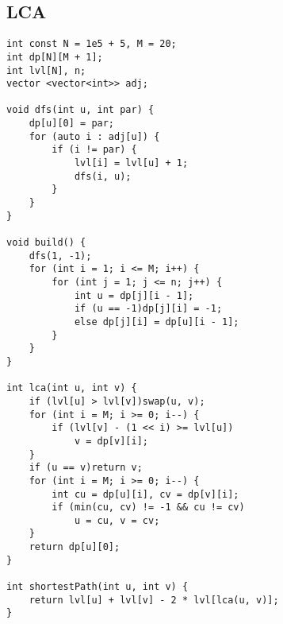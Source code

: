 \documentclass{article}
\begin{document}
\subsection{LCA}
\begin{verbatim}
int const N = 1e5 + 5, M = 20;
int dp[N][M + 1];
int lvl[N], n;
vector <vector<int>> adj;
 
void dfs(int u, int par) {
    dp[u][0] = par;
    for (auto i : adj[u]) {
        if (i != par) {
            lvl[i] = lvl[u] + 1;
            dfs(i, u);
        }
    }
}
 
void build() {
    dfs(1, -1);
    for (int i = 1; i <= M; i++) {
        for (int j = 1; j <= n; j++) {
            int u = dp[j][i - 1];
            if (u == -1)dp[j][i] = -1;
            else dp[j][i] = dp[u][i - 1];
        }
    }
}
 
int lca(int u, int v) {
    if (lvl[u] > lvl[v])swap(u, v);
    for (int i = M; i >= 0; i--) {
        if (lvl[v] - (1 << i) >= lvl[u])
            v = dp[v][i];
    }
    if (u == v)return v;
    for (int i = M; i >= 0; i--) {
        int cu = dp[u][i], cv = dp[v][i];  
		if (min(cu, cv) != -1 && cu != cv)  
		    u = cu, v = cv;
    }
    return dp[u][0];
}
 
int shortestPath(int u, int v) {
    return lvl[u] + lvl[v] - 2 * lvl[lca(u, v)];
}
\end{verbatim}
\end{document}
